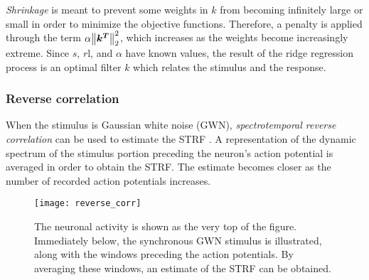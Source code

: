 \emph{Shrinkage} is meant to prevent some weights in $k$ from becoming infinitely large or small in order to minimize the objective functions. Therefore, a penalty is applied through the term $\alpha \norm{\bm{k^T}}_2^2$, which increases as the weights become increasingly extreme. Since $s$, $r$l, and $\alpha$ have known values, the result of the ridge regression process is an optimal filter $k$ which relates the stimulus and the response.

\subsubsection{Reverse correlation}
When the stimulus is Gaussian white noise (GWN), \emph{spectrotemporal reverse correlation} can be used to estimate the STRF \parencite{kleinRobustSpectrotemporalReverse2000}. A representation of the dynamic spectrum of the stimulus portion preceding the neuron's action potential is averaged in order to obtain the STRF. The estimate becomes closer as the number of recorded action potentials increases.

\begin{figure}
	\centering
	\texttt{[image: reverse\_corr]}
	\caption{The neuronal activity is shown as the very top of the figure. Immediately below, the synchronous GWN stimulus is illustrated, along with the windows preceding the action potentials. By averaging these windows, an estimate of the STRF can be obtained.\parencite{kleinRobustSpectrotemporalReverse2000}}
\end{figure}

